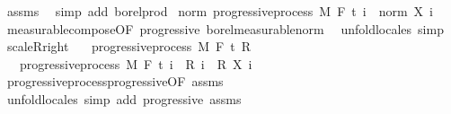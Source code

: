 \begin{isabellebody}
\ assms\ \isamarkupfalse%
\ {\isacharparenleft}{\kern0pt}simp\ add{\isacharcolon}{\kern0pt}\ borel{\isacharunderscore}{\kern0pt}prod{\isacharparenright}{\kern0pt}\isanewline
{}\isamarkupfalse%
%
\endisatagproof
{\isafoldproof}%
%
\isadelimproof
\isanewline
%
\endisadelimproof
\isanewline
{}\isamarkupfalse%
\ norm{\isacharcolon}{\kern0pt}\ {\isachardoublequoteopen}progressive{\isacharunderscore}{\kern0pt}process\ M\ F\ t\ {\isacharparenleft}{\kern0pt}{\isasymlambda}i\ {\isasymxi}{\isachardot}{\kern0pt}\ norm\ {\isacharparenleft}{\kern0pt}X\ i\ {\isasymxi}{\isacharparenright}{\kern0pt}{\isacharparenright}{\kern0pt}{\isachardoublequoteclose}%
\isadelimproof
\ %
\endisadelimproof
%
\isatagproof
{}\isamarkupfalse%
\ measurable{\isacharunderscore}{\kern0pt}compose{\isacharbrackleft}{\kern0pt}OF\ progressive\ borel{\isacharunderscore}{\kern0pt}measurable{\isacharunderscore}{\kern0pt}norm{\isacharbrackright}{\kern0pt}\ \isamarkupfalse%
\ {\isacharparenleft}{\kern0pt}unfold{\isacharunderscore}{\kern0pt}locales{\isacharparenright}{\kern0pt}\ simp%
\endisatagproof
{\isafoldproof}%
%
\isadelimproof
%
\endisadelimproof
\isanewline
\isanewline
{}\isamarkupfalse%
\ scaleR{\isacharunderscore}{\kern0pt}right{\isacharcolon}{\kern0pt}\isanewline
\ \ \ {\isachardoublequoteopen}progressive{\isacharunderscore}{\kern0pt}process\ M\ F\ t\ R{\isachardoublequoteclose}\isanewline
\ \ \ {\isachardoublequoteopen}progressive{\isacharunderscore}{\kern0pt}process\ M\ F\ t\ {\isacharparenleft}{\kern0pt}{\isasymlambda}i\ {\isasymxi}{\isachardot}{\kern0pt}\ {\isacharparenleft}{\kern0pt}R\ i\ {\isasymxi}{\isacharparenright}{\kern0pt}\ {\isacharasterisk}{\kern0pt}\isactrlsub R\ {\isacharparenleft}{\kern0pt}X\ i\ {\isasymxi}{\isacharparenright}{\kern0pt}{\isacharparenright}{\kern0pt}{\isachardoublequoteclose}\isanewline
%
\isadelimproof
\ \ %
\endisadelimproof
%
\isatagproof
{}\isamarkupfalse%
\ progressive{\isacharunderscore}{\kern0pt}process{\isachardot}{\kern0pt}progressive{\isacharbrackleft}{\kern0pt}OF\ assms{\isacharbrackright}{\kern0pt}\ \isamarkupfalse%
\ {\isacharparenleft}{\kern0pt}unfold{\isacharunderscore}{\kern0pt}locales{\isacharparenright}{\kern0pt}\ {\isacharparenleft}{\kern0pt}simp\ add{\isacharcolon}{\kern0pt}\ progressive\ assms{\isacharparenright}{\kern0pt}%
\endisatagproof
{\isafoldproof}%
%
\isadelimproof
\isanewline
%
\endisadelimproof

\end{isabellebody}
